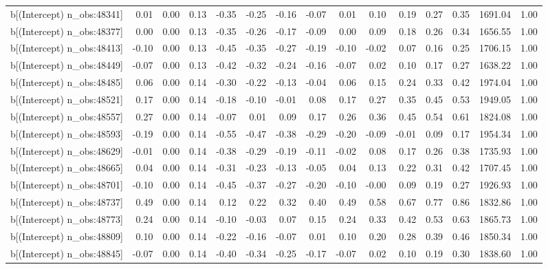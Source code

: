 \begin{table}[ht]
\begin{tabular}{rrrrrrrrrrrrrrr}
  b[(Intercept) n\_obs:48341] & 0.01 & 0.00 & 0.13 & -0.35 & -0.25 & -0.16 & -0.07 & 0.01 & 0.10 & 0.19 & 0.27 & 0.35 & 1691.04 & 1.00 \\ 
  b[(Intercept) n\_obs:48377] & 0.00 & 0.00 & 0.13 & -0.35 & -0.26 & -0.17 & -0.09 & 0.00 & 0.09 & 0.18 & 0.26 & 0.34 & 1656.55 & 1.00 \\ 
  b[(Intercept) n\_obs:48413] & -0.10 & 0.00 & 0.13 & -0.45 & -0.35 & -0.27 & -0.19 & -0.10 & -0.02 & 0.07 & 0.16 & 0.25 & 1706.15 & 1.00 \\ 
  b[(Intercept) n\_obs:48449] & -0.07 & 0.00 & 0.13 & -0.42 & -0.32 & -0.24 & -0.16 & -0.07 & 0.02 & 0.10 & 0.17 & 0.27 & 1638.22 & 1.00 \\ 
  b[(Intercept) n\_obs:48485] & 0.06 & 0.00 & 0.14 & -0.30 & -0.22 & -0.13 & -0.04 & 0.06 & 0.15 & 0.24 & 0.33 & 0.42 & 1974.04 & 1.00 \\ 
  b[(Intercept) n\_obs:48521] & 0.17 & 0.00 & 0.14 & -0.18 & -0.10 & -0.01 & 0.08 & 0.17 & 0.27 & 0.35 & 0.45 & 0.53 & 1949.05 & 1.00 \\ 
  b[(Intercept) n\_obs:48557] & 0.27 & 0.00 & 0.14 & -0.07 & 0.01 & 0.09 & 0.17 & 0.26 & 0.36 & 0.45 & 0.54 & 0.61 & 1824.08 & 1.00 \\ 
  b[(Intercept) n\_obs:48593] & -0.19 & 0.00 & 0.14 & -0.55 & -0.47 & -0.38 & -0.29 & -0.20 & -0.09 & -0.01 & 0.09 & 0.17 & 1954.34 & 1.00 \\ 
  b[(Intercept) n\_obs:48629] & -0.01 & 0.00 & 0.14 & -0.38 & -0.29 & -0.19 & -0.11 & -0.02 & 0.08 & 0.17 & 0.26 & 0.38 & 1735.93 & 1.00 \\ 
  b[(Intercept) n\_obs:48665] & 0.04 & 0.00 & 0.14 & -0.31 & -0.23 & -0.13 & -0.05 & 0.04 & 0.13 & 0.22 & 0.31 & 0.42 & 1707.45 & 1.00 \\ 
  b[(Intercept) n\_obs:48701] & -0.10 & 0.00 & 0.14 & -0.45 & -0.37 & -0.27 & -0.20 & -0.10 & -0.00 & 0.09 & 0.19 & 0.27 & 1926.93 & 1.00 \\ 
  b[(Intercept) n\_obs:48737] & 0.49 & 0.00 & 0.14 & 0.12 & 0.22 & 0.32 & 0.40 & 0.49 & 0.58 & 0.67 & 0.77 & 0.86 & 1832.86 & 1.00 \\ 
  b[(Intercept) n\_obs:48773] & 0.24 & 0.00 & 0.14 & -0.10 & -0.03 & 0.07 & 0.15 & 0.24 & 0.33 & 0.42 & 0.53 & 0.63 & 1865.73 & 1.00 \\ 
  b[(Intercept) n\_obs:48809] & 0.10 & 0.00 & 0.14 & -0.22 & -0.16 & -0.07 & 0.01 & 0.10 & 0.20 & 0.28 & 0.39 & 0.46 & 1850.34 & 1.00 \\ 
  b[(Intercept) n\_obs:48845] & -0.07 & 0.00 & 0.14 & -0.40 & -0.34 & -0.25 & -0.17 & -0.07 & 0.02 & 0.10 & 0.19 & 0.30 & 1838.60 & 1.00 \\ 

\end{tabular}
\end{table}
